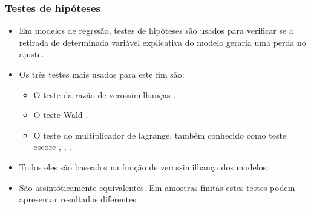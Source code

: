 \documentclass[10pt,
  aspectratio=169,
  serif,
  mathserif,
  professionalfont,
  compress,
  handout,
  ]{beamer}\usepackage[]{graphicx}\usepackage[]{color}
\begin{document}

\begin{frame}
  \frametitle{Testes de hipóteses}
  \begin{itemize}
    \itemsep 2ex
  
  \item Em modelos de regrssão, testes de hipóteses são usados para verificar se a retirada de determinada variável explicativa do modelo geraria uma perda no ajuste.
  
  \item Os três testes mais usados para este fim são:

    \begin{itemize}
      \item O teste da razão de verossimilhanças \cite{trv}.
      \item O teste Wald \cite{wald}.
      \item O teste do multiplicador de lagrange, também conhecido como teste escore \cite{score1}, \cite{score2}, \cite{score3}.
    \end{itemize}
  
  \item Todos eles são baseados na função de verossimilhança dos modelos.
  
  
  \item São assintóticamente equivalentes. Em amostras finitas estes testes podem apresentar resultados diferentes \cite{conflict}.
  
  \end{itemize}
  
\end{frame}

\end{document}
